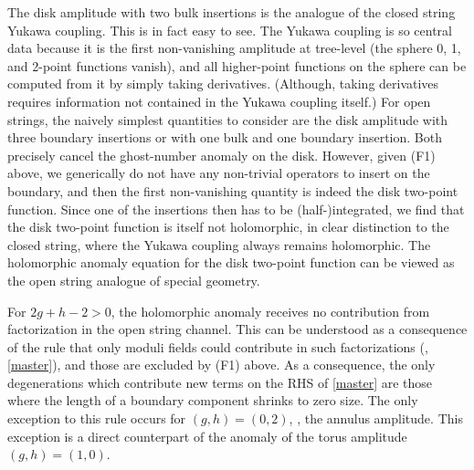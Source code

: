 \begin{list}{}
\item[(F3)] The disk amplitude with two bulk insertions is the analogue
of the closed string Yukawa coupling. This is in fact easy to see.
The Yukawa coupling is so central data because it is the first non-vanishing 
amplitude at tree-level (the sphere 0, 1, and 2-point functions vanish),
and all higher-point functions on the sphere can be computed from it by 
simply taking derivatives. (Although, taking derivatives requires information 
not contained in the Yukawa coupling itself.) For open strings, the naively
simplest quantities to consider are the disk amplitude with three boundary
insertions or with one bulk and one boundary insertion. Both precisely
cancel the ghost-number anomaly on the disk. However, given (F1) above, we 
generically do not have any non-trivial operators to insert on the boundary,
and then the first non-vanishing quantity is indeed the disk two-point 
function. Since one of the insertions then has to be (half-)integrated,
we find that the disk two-point function is itself not holomorphic, in clear
distinction to the closed string, where the Yukawa coupling always remains
holomorphic. The holomorphic anomaly equation for the disk two-point function
can be viewed as the open string analogue of special geometry.

\item[(F4)] For $2g+h-2>0$, the holomorphic anomaly receives no contribution 
from factorization in the open string channel. This can be understood as a 
consequence of the rule that only moduli fields could contribute in such
factorizations (\cf, \eqref{master}), and those are excluded by (F1) above.
As a consequence, the only degenerations which contribute new terms on the 
RHS of \eqref{master} are those where the length of a boundary component 
shrinks to zero size. The only exception to this rule occurs for $(g,h)=(0,2)$, 
\ie, the annulus amplitude. This exception is a direct counterpart of the 
anomaly of the torus amplitude $(g,h)=(1,0)$.

\end{list}

